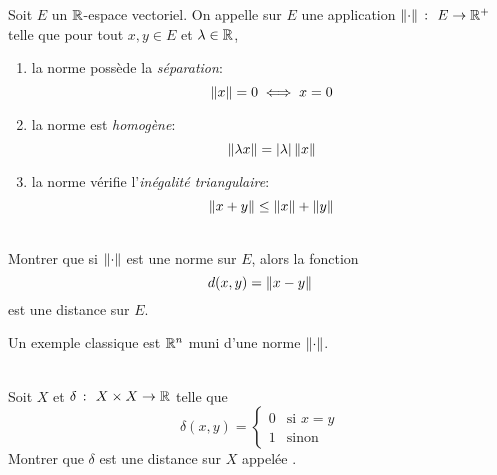 \begin{definition}
    Soit \(E\) un \(\mathbb{R}\)-espace vectoriel.
    On appelle  sur \(E\) une application \(\mathopen{}\left\|\cdot\right\|\mathclose{}\ \colon\ E \to \mathbb{R}^+\) telle que
    pour tout \(x, y \in E\) et \(\lambda \in \mathbb{R}\),
    \begin{enumerate}[label=(\roman*)]
        \item la norme possède la \emph{séparation}:
        \begin{equation*}
            \mathopen{}\left\|x\right\|\mathclose{} = 0 \iff x = 0
        \end{equation*}

        \item la norme est \emph{homogène}:
        \begin{equation*}
            \mathopen{}\left\|\lambda x\right\|\mathclose{} = \left\lvert\lambda\right\rvert \mathopen{}\left\|x\right\|\mathclose{}
        \end{equation*}

        \item la norme vérifie l'\emph{inégalité triangulaire}:
        \begin{equation*}
            \mathopen{}\left\|x + y\right\|\mathclose{} \leq \mathopen{}\left\|x\right\|\mathclose{} + \mathopen{}\left\|y\right\|\mathclose{}
        \end{equation*}
    \end{enumerate}
\end{definition}

\begin{exercice}[\(\star\)]\,\\
    Montrer que si \(\mathopen{}\left\|\cdot\right\|\mathclose{}\) est une norme sur \(E\), alors la fonction
    \begin{equation*}
        d(x, y) = \mathopen{}\left\|x - y\right\|\mathclose{}
    \end{equation*}
    est une distance sur \(E\).
\end{exercice}

\begin{example}
    Un exemple classique est \(\mathbb{R}^n\) muni d'une norme \(\mathopen{}\left\|\cdot\right\|\mathclose{}\).
\end{example}

\begin{exercice}[\(\star\)]\,\\
    Soit \(X\) et \(\delta\ \colon\ X \times X \to \mathbb{R}\) telle que
    \begin{equation*}
        \delta(x, y) = \begin{cases}
            0 & \text{si } x = y \\
            1 & \text{sinon}
        \end{cases}
    \end{equation*}
    Montrer que \(\delta\) est une distance sur \(X\) appelée .
\end{exercice}

